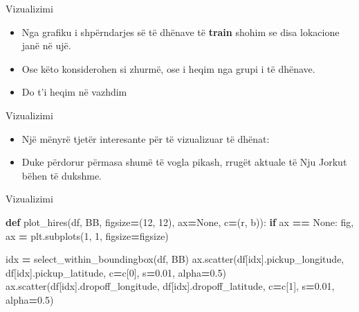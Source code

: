 \documentclass[
  ignorenonframetext,
]{beamer}
\newenvironment{Shaded}{\begin{snugshade}}{\end{snugshade}}
\newcommand{\ControlFlowTok}[1]{\textcolor[rgb]{0.13,0.29,0.53}{\textbf{#1}}}
\newcommand{\DecValTok}[1]{\textcolor[rgb]{0.00,0.00,0.81}{#1}}
\newcommand{\FloatTok}[1]{\textcolor[rgb]{0.00,0.00,0.81}{#1}}
\newcommand{\KeywordTok}[1]{\textcolor[rgb]{0.13,0.29,0.53}{\textbf{#1}}}
\newcommand{\NormalTok}[1]{#1}
\newcommand{\OperatorTok}[1]{\textcolor[rgb]{0.81,0.36,0.00}{\textbf{#1}}}
\newcommand{\StringTok}[1]{\textcolor[rgb]{0.31,0.60,0.02}{#1}}
\newcommand{\VariableTok}[1]{\textcolor[rgb]{0.00,0.00,0.00}{#1}}
\begin{document}
\begin{frame}{Vizualizimi}
\protect\hypertarget{vizualizimi-5}{}
\begin{itemize}
\item
  Nga grafiku i shpërndarjes së të dhënave të \textbf{train} shohim se
  disa lokacione janë në ujë.
\item
  Ose këto konsiderohen si zhurmë, ose i heqim nga grupi i të dhënave.
\item
  Do t'i heqim në vazhdim
\end{itemize}
\end{frame}

\begin{frame}{Vizualizimi}
\protect\hypertarget{vizualizimi-6}{}
\begin{itemize}
\item
  Një mënyrë tjetër interesante për të vizualizuar të dhënat:
\item
  Duke përdorur përmasa shumë të vogla pikash, rrugët aktuale të Nju
  Jorkut bëhen të dukshme.
\end{itemize}
\end{frame}

\begin{frame}[fragile]{Vizualizimi}
\protect\hypertarget{vizualizimi-7}{}

\begin{Shaded}
\begin{Highlighting}[]
\KeywordTok{def}\NormalTok{ plot\_hires(df, BB, figsize}\OperatorTok{=}\NormalTok{(}\DecValTok{12}\NormalTok{, }\DecValTok{12}\NormalTok{), ax}\OperatorTok{=}\VariableTok{None}\NormalTok{, c}\OperatorTok{=}\NormalTok{(}\StringTok{\textquotesingle{}r\textquotesingle{}}\NormalTok{, }\StringTok{\textquotesingle{}b\textquotesingle{}}\NormalTok{)):}
    \ControlFlowTok{if}\NormalTok{ ax }\OperatorTok{==} \VariableTok{None}\NormalTok{:}
\NormalTok{        fig, ax }\OperatorTok{=}\NormalTok{ plt.subplots(}\DecValTok{1}\NormalTok{, }\DecValTok{1}\NormalTok{, figsize}\OperatorTok{=}\NormalTok{figsize)}

\NormalTok{    idx }\OperatorTok{=}\NormalTok{ select\_within\_boundingbox(df, BB)}
\NormalTok{    ax.scatter(df[idx].pickup\_longitude, df[idx].pickup\_latitude, c}\OperatorTok{=}\NormalTok{c[}\DecValTok{0}\NormalTok{], s}\OperatorTok{=}\FloatTok{0.01}\NormalTok{, alpha}\OperatorTok{=}\FloatTok{0.5}\NormalTok{)}
\NormalTok{    ax.scatter(df[idx].dropoff\_longitude, df[idx].dropoff\_latitude, c}\OperatorTok{=}\NormalTok{c[}\DecValTok{1}\NormalTok{], s}\OperatorTok{=}\FloatTok{0.01}\NormalTok{, alpha}\OperatorTok{=}\FloatTok{0.5}\NormalTok{)}
\end{Highlighting}
\end{Shaded}
\end{frame}
\end{document}
